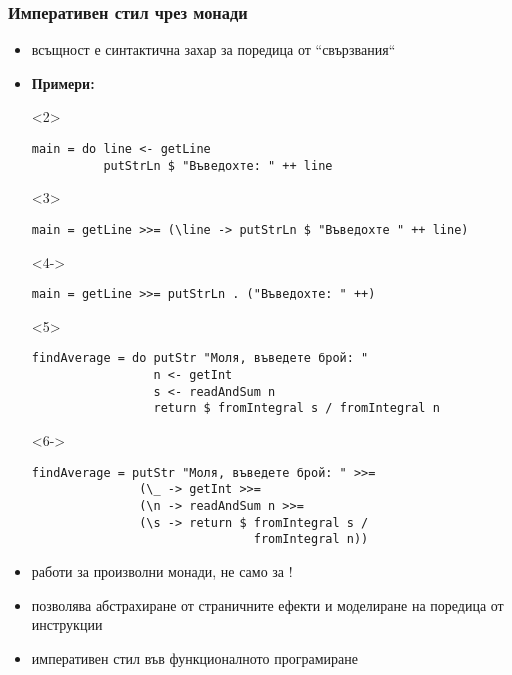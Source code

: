 \documentclass[alsotrans]{beamerswitch}
\begin{document}
\begin{frame}[fragile]
  \frametitle{Императивен стил чрез монади}

  \small
  \begin{fixedarea}
    \begin{itemize}[<+->]
    \item {} всъщност е синтактична захар за поредица от ``свързвания``
    \item \textbf{Примери:}
      \begin{onlyenv}<2>
\begin{lstlisting}
main = do line <- getLine
          putStrLn $ "Въведохте: " ++ line
\end{lstlisting}
      \end{onlyenv}
      \begin{onlyenv}<3>
\begin{lstlisting}
main = getLine >>= (\line -> putStrLn $ "Въведохте " ++ line)
\end{lstlisting}
      \end{onlyenv}
      \begin{onlyenv}<4->
\begin{lstlisting}
main = getLine >>= putStrLn . ("Въведохте: " ++)
\end{lstlisting}
      \end{onlyenv}
      \begin{onlyenv}<5>
\begin{lstlisting}
findAverage = do putStr "Моля, въведете брой: "
                 n <- getInt
                 s <- readAndSum n
                 return $ fromIntegral s / fromIntegral n
\end{lstlisting}
      \end{onlyenv}
      \begin{onlyenv}<6->
\begin{lstlisting}
findAverage = putStr "Моля, въведете брой: " >>=
               (\_ -> getInt >>=
               (\n -> readAndSum n >>=
               (\s -> return $ fromIntegral s /
                               fromIntegral n))
\end{lstlisting}
      \end{onlyenv}
    \item<7-> работи за произволни монади, не само за !
    \item<8-> позволява абстрахиране от страничните ефекти и моделиране на поредица от инструкции
    \item<9-> императивен стил във функционалното програмиране
    \end{itemize}
  \end{fixedarea}
\end{frame}
\end{document}
